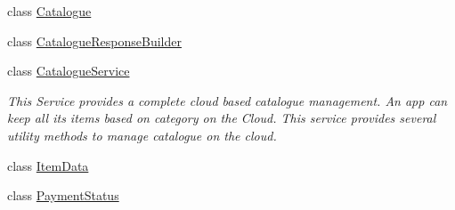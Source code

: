 \begin{DoxyCompactItemize}
class \hyperlink{classcom_1_1shephertz_1_1app42_1_1paas_1_1sdk_1_1windows_1_1shopping_1_1_catalogue}{Catalogue}
\item 
class \hyperlink{classcom_1_1shephertz_1_1app42_1_1paas_1_1sdk_1_1windows_1_1shopping_1_1_catalogue_response_builder}{Catalogue\+Response\+Builder}
\item 
class \hyperlink{classcom_1_1shephertz_1_1app42_1_1paas_1_1sdk_1_1windows_1_1shopping_1_1_catalogue_service}{Catalogue\+Service}
\begin{DoxyCompactList}\small\item\em This Service provides a complete cloud based catalogue management. An app can keep all its items based on category on the Cloud. This service provides several utility methods to manage catalogue on the cloud. \end{DoxyCompactList}\item 
class \hyperlink{classcom_1_1shephertz_1_1app42_1_1paas_1_1sdk_1_1windows_1_1shopping_1_1_item_data}{Item\+Data}
\item 
class \hyperlink{classcom_1_1shephertz_1_1app42_1_1paas_1_1sdk_1_1windows_1_1shopping_1_1_payment_status}{Payment\+Status}
\end{DoxyCompactItemize}
